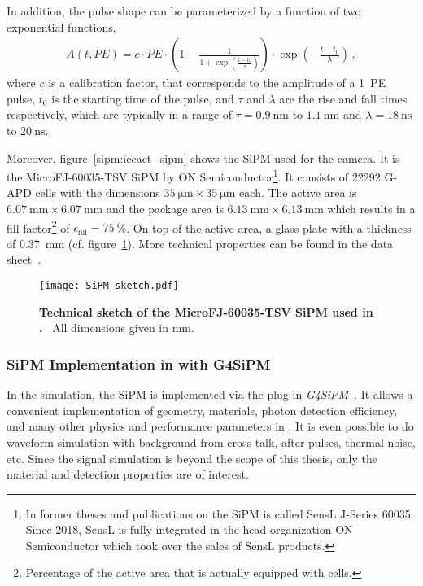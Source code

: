 In addition, the pulse shape can be parameterized by a function of two exponential functions,
\begin{align}
	A(t,PE) = c\cdot PE \cdot \left(1-\frac{1}{1+\exp\left(\frac{t-t_0}{\tau}\right)}\right)\cdot\exp\left(-\frac{t-t_0}{\lambda}\right)\,,
\end{align}
where $c$ is a calibration factor, that corresponds to the amplitude of a \SI{1}{PE} pulse, $t_0$ is the starting time of the pulse, and $\tau$ and $\lambda$ are the rise and fall times respectively, which are typically in a range of $\tau=\SI{0.9}{\nano\meter}$ to $\SI{1.1}{\nano\meter}$ and $\lambda=\SI{18}{\nano\second}$ to $\SI{20}{\nano\second}$.~\cite{sipm:fact_calibration}

Moreover, figure~\ref{sipm:iceact_sipm} shows the SiPM used for the \iceact camera. It is the MicroFJ-60035-TSV SiPM by ON Semiconductor\footnote{In former theses and publications on \iceact the SiPM is called SensL J-Series 60035. Since 2018, SensL is fully integrated in the head organization ON Semiconductor which took over the sales of SensL products.}. 
It consists of \num{22292} G-APD cells with the dimensions $\SI{35}{\micro\meter}\times\SI{35}{\micro\meter}$ each. The active area is $\SI{6.07}{\milli\meter}\times\SI{6.07}{\milli\meter}$ and the package area is $\SI{6.13}{\milli\meter}\times\SI{6.13}{\milli\meter}$ which results in a fill factor\footnote{Percentage of the active area that is actually equipped with cells.} of $\epsilon_\text{fill}=\SI{75}{\percent}$. On top of the active area, a glass plate with a thickness of \SI{0.37}{\milli\meter} (cf. figure~\ref{sipm:tec_sketch}). More technical properties can be found in the data sheet~\cite{sipm:datasheet}.

\begin{figure}[H]
	\centering
	\texttt{[image: SiPM\_sketch.pdf]}
	\caption[Technical sketch of the MicroFJ-60035-TSV SiPM used in \iceact]{\textbf{Technical sketch of the MicroFJ-60035-TSV SiPM used in \iceact.}~\cite{sipm:datasheet} All dimensions given in \si{\milli\meter}.}
	\label{sipm:tec_sketch}	
\end{figure}

\subsubsection{SiPM Implementation in \geant with G4SiPM}

In the \iceact \geant simulation, the SiPM is implemented via the plug-in \textit{G4SiPM}~\cite{sipm:g4sipm}. It allows a convenient implementation of geometry, materials, photon detection efficiency, and many other physics and performance parameters in \geant. It is even possible to do waveform simulation with background from cross talk, after pulses, thermal noise, etc. Since the signal simulation is beyond the scope of this thesis, only the material and detection properties are of interest.


